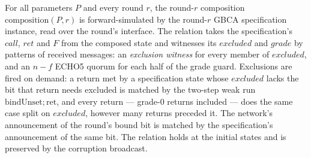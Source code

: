 \begin{theorem}
  \label{thm:aba-gbca-composition-by-abdy-refines-specification}
  \leanok
  For all parameters $P$ and every round $r$, the round-$r$ composition $\mathrm{composition}(P,r)$ is forward-simulated by the round-$r$ GBCA specification instance, read over the round's interface.
  The relation takes the specification's $call$, $ret$ and $F$ from the composed state and witnesses its $excluded$ and $grade$ by patterns of received messages: an \emph{exclusion witness} for every member of $excluded$, and an $n{-}f$ ECHO5 quorum for each half of the grade guard.
  Exclusions are fired on demand: a return met by a specification state whose $excluded$ lacks the bit that return needs excluded is matched by the two-step weak run $\mathrm{bindUnset};\mathrm{ret}$, and every return --- grade-0 returns included --- does the same case split on $excluded$, however many returns preceded it.
  The network's announcement of the round's bound bit is matched by the specification's announcement of the same bit.
  The relation holds at the initial states and is preserved by the corruption broadcast.
\end{theorem}

